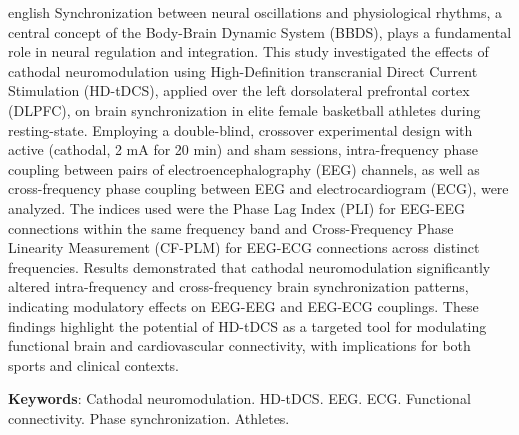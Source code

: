 \begin{resumo}[Abstract]
\begin{otherlanguage*}{english}
Synchronization between neural oscillations and physiological rhythms, a central concept of the Body-Brain Dynamic System (BBDS), plays a fundamental role in neural regulation and integration. This study investigated the effects of cathodal neuromodulation using High-Definition transcranial Direct Current Stimulation (HD-tDCS), applied over the left dorsolateral prefrontal cortex (DLPFC), on brain synchronization in elite female basketball athletes during resting-state. Employing a double-blind, crossover experimental design with active (cathodal, 2 mA for 20 min) and sham sessions, intra-frequency phase coupling between pairs of electroencephalography (EEG) channels, as well as cross-frequency phase coupling between EEG and electrocardiogram (ECG), were analyzed. The indices used were the Phase Lag Index (PLI) for EEG-EEG connections within the same frequency band and Cross-Frequency Phase Linearity Measurement (CF-PLM) for EEG-ECG connections across distinct frequencies. Results demonstrated that cathodal neuromodulation significantly altered intra-frequency and cross-frequency brain synchronization patterns, indicating modulatory effects on EEG-EEG and EEG-ECG couplings. These findings highlight the potential of HD-tDCS as a targeted tool for modulating functional brain and cardiovascular connectivity, with implications for both sports and clinical contexts.

\vspace{\onelineskip}
 
\noindent 
\textbf{Keywords}: Cathodal neuromodulation. HD-tDCS. EEG. ECG. Functional connectivity. Phase synchronization. Athletes.
\end{otherlanguage*}
\end{resumo}